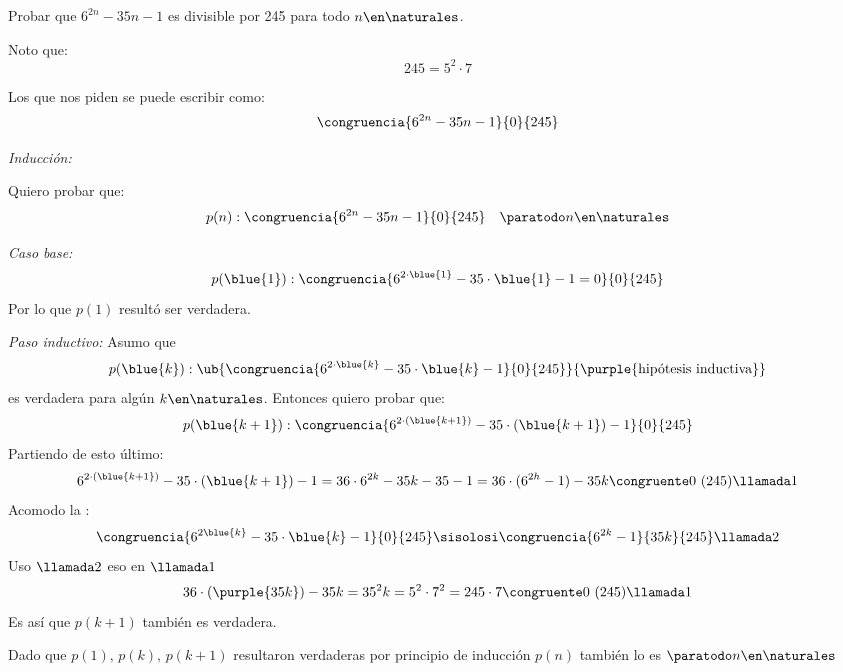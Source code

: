 \begin{enunciado}{\ejExtra}
	Probar que $6^{2n} - 35n -1$ es divisible por 245 para todo $n \en \naturales$.
\end{enunciado}

Noto que:
$$
	245 = 5^2 \cdot 7
$$

Los que nos piden se puede escribir como:
$$
	\congruencia{6^{2n} - 35n -1}{0}{245}
$$

\textit{Inducción:}

Quiero probar que:
$$
	p(n) : \congruencia{6^{2n} - 35n -1}{0}{245} \quad \paratodo n \en \naturales
$$

\textit{Caso base:}
$$
	p(\blue{1}) :
	\congruencia{
		6^{2 \cdot \blue{1}} - 35 \cdot {\blue{1}} -1 = 0 }{0}{245}
$$
Por lo que $p(1)$ resultó ser verdadera.

\textit{Paso inductivo:}
Asumo que
$$
	p(\blue{k}) : \ub{\congruencia{ 6^{2 \cdot \blue{k}} - 35 \cdot {\blue{k}} -1}{0}{245}}{\purple{\text{hipótesis inductiva}}}
$$
es verdadera para algún $k \en \naturales$. Entonces quiero probar que:
$$
	p(\blue{k+1}) : \congruencia{ 6^{2 \cdot (\blue{k+1})} - 35 \cdot ({\blue{k+1}}) -1}{0}{245}
$$
Partiendo de esto último:
$$
	6^{2 \cdot (\blue{k+1})} - 35 \cdot ({\blue{k+1}}) -1
	=
	36 \cdot 6^{2k} - 35k -35 -1
	=
	36 \cdot (6^{2h} - 1) - 35k \congruente 0 \ (245) \llamada1
$$
Acomodo la :
$$
	\congruencia{ 6^{2 \blue{k}} - 35 \cdot {\blue{k}} -1}{0}{245}
	\sisolosi
	\congruencia{ 6^{2 k} -1 }{35k}{245} \llamada2
$$
Uso $\llamada2$ eso en $\llamada1$
$$
	36 \cdot (\purple{35k}) - 35k = 35^2k = 5^2 \cdot 7^2= 245 \cdot 7 \congruente 0 \ (245) \llamada1
$$
Es así que $p(k+1)$ también es verdadera.

\bigskip

Dado que $p(1),\, p(k),\, p(k+1)$ resultaron verdaderas por principio de inducción $p(n)$ también lo es $\paratodo n \en \naturales$

\begin{aportes}
	\item {}
\end{aportes}
